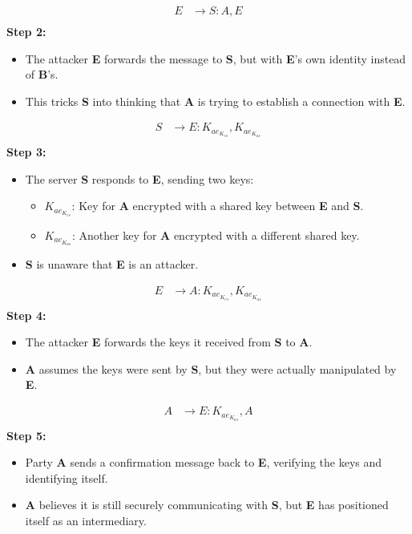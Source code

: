 \begin{align*}
    E &\rightarrow S: A, E \\
\end{align*}
\textbf{Step 2:} 
\begin{itemize}
    \item The attacker \textbf{E} forwards the message to \textbf{S}, but with \textbf{E}'s own identity instead of \textbf{B}'s.
    \item This tricks \textbf{S} into thinking that \textbf{A} is trying to establish a connection with \textbf{E}.
\end{itemize}

\begin{align*}
    S &\rightarrow E: K_{ae_{K_{es}}}, K_{ae_{K_{as}}} \\
\end{align*}
\textbf{Step 3:}
\begin{itemize}
    \item The server \textbf{S} responds to \textbf{E}, sending two keys:
    \begin{itemize}
        \item $K_{ae_{K_{es}}}$: Key for \textbf{A} encrypted with a shared key between \textbf{E} and \textbf{S}.
        \item $K_{ae_{K_{as}}}$: Another key for \textbf{A} encrypted with a different shared key.
    \end{itemize}
    \item \textbf{S} is unaware that \textbf{E} is an attacker.
\end{itemize}

\begin{align*}
    E &\rightarrow A: K_{ae_{K_{es}}}, K_{ae_{K_{as}}} \\
\end{align*}
\textbf{Step 4:}
\begin{itemize}
    \item The attacker \textbf{E} forwards the keys it received from \textbf{S} to \textbf{A}.
    \item \textbf{A} assumes the keys were sent by \textbf{S}, but they were actually manipulated by \textbf{E}.
\end{itemize}

\begin{align*}
    A &\rightarrow E: K_{ae_{K_{as}}}, A \\
\end{align*}
\textbf{Step 5:}
\begin{itemize}
    \item Party \textbf{A} sends a confirmation message back to \textbf{E}, verifying the keys and identifying itself.
    \item \textbf{A} believes it is still securely communicating with \textbf{S}, but \textbf{E} has positioned itself as an intermediary.
\end{itemize}

